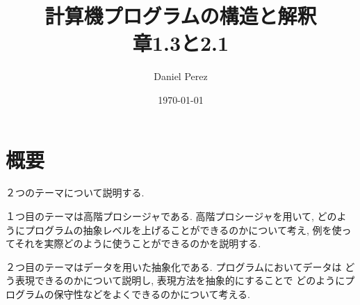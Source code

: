 \documentclass[a4paper,10pt,fleqn]{article}
\author{Daniel Perez}
\date{\today}
\title{
  計算機プログラムの構造と解釈\\
  章1.3と2.1
}
\begin{document}
\maketitle
%
\section*{概要}
２つのテーマについて説明する.

１つ目のテーマは高階プロシージャである. 高階プロシージャを用いて,
どのようにプログラムの抽象レベルを上げることができるのかについて考え,
例を使ってそれを実際どのように使うことができるのかを説明する.

２つ目のテーマはデータを用いた抽象化である. プログラムにおいてデータは
どう表現できるのかについて説明し, 表現方法を抽象的にすることで
どのようにプログラムの保守性などをよくできるのかについて考える.
%

%

%
\end{document}
